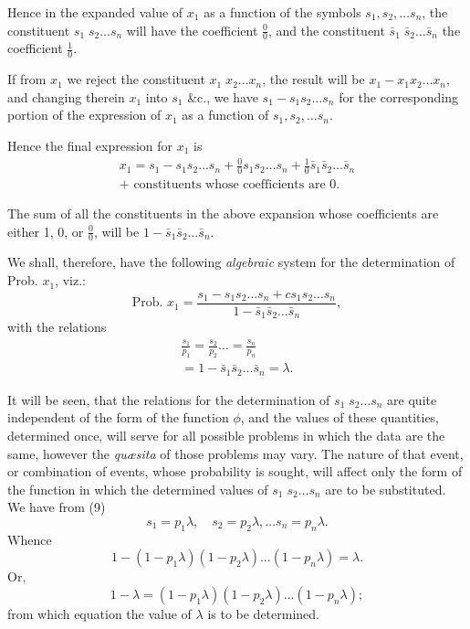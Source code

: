 \documentclass[oneside]{book}
\begin{document}
Hence in the expanded value of $x_1$ as a function of the symbols
$s_1, s_2, \dotsc s_n$, the constituent $s_1 \; s_2 \dotsc s_n$ will have the coefficient
$\frac{0}{0}$, and the constituent
$\bar{s}_1 \; \bar{s}_2 \dotsc \bar{s}_n$ the coefficient $\frac{1}{0}$.

If from $x_1$ we reject the constituent $x_1 \; x_2 \dotsc x_n$, the result
will be $x_1 - x_1x_2 \dotsc x_n$, and changing therein $x_1$ into $s_1$ \&c., we
have $s_1 - s_1s_2 \dotsc s_n$ for the corresponding portion of the expression of $x_1$ as a function of $s_1, s_2, \dotsc s_n$.

Hence the final expression for $x_1$ is
\begin{equation*}
\begin{split}
  x_1 = s_1 - s_1s_2 \dotsc s_n
      + \frac{0}{0}s_1s_2 \dotsc s_n
      + \frac{1}{0}\bar{s}_1\bar{s}_2 \dotsc \bar{s}_n   \\
  + \text{ constituents whose coefficients are }0.
\end{split}
  \tag{7}
\end{equation*}

The sum of all the constituents in the above expansion whose
coefficients are either 1, 0, or $\frac{0}{0}$, will be
$1 - \bar{s}_1\bar{s}_2 \dotsc \bar{s}_n$.

We shall, therefore, have the following \emph{algebraic} system for
the determination of Prob. $x_1$, viz.:
\[
  \text{Prob. }x_1 = \frac{s_1 - s_1s_2 \dotsc s_n + cs_1s_2 \dotsc s_n}{1 - \bar{s}_1\bar{s}_2 \dotsc \bar{s}_n},  \tag{8}
\]
with the relations
\begin{equation*}
\begin{split}
  \frac{s_1}{p_1} = \frac{s_2}{p_2} \dotsc = \frac{s_n}{p_n}   \\
  = 1 - \bar{s}_1 \bar{s}_2 \dotsc \bar{s}_n = \lambda.
\end{split}
   \tag{9}
\end{equation*}

It will be seen, that the relations for the determination of
$s_1 \; s_2 \dotsc s_n$ are quite independent of the form of the function $\phi$,
and the values of these quantities, determined once, will serve
for all possible problems in which the data are the same, however
the \emph{qu{\ae}sita} of those problems may vary. The nature of
that event, or combination of events, whose probability is sought,
will affect only the form of the function in which the determined
values of $s_1 \; s_2 \dotsc s_n$ are to be substituted.
We have from (9)
\[
  s_1 = p_1 \lambda, \quad
  s_2 = p_2 \lambda, \dotsc
  s_n = p_n \lambda.
\]
Whence
\[
  1 - (1 - p_1 \lambda)(1 - p_2 \lambda) \dotsc (1 - p_n \lambda)
 = \lambda.
\]
Or,
\[
  1 - \lambda
  = (1 - p_1 \lambda)(1 - p_2 \lambda) \dotsc (1 - p_n \lambda);  \tag{10}
\]
from which equation the value of $\lambda$ is to be determined.
\end{document}
